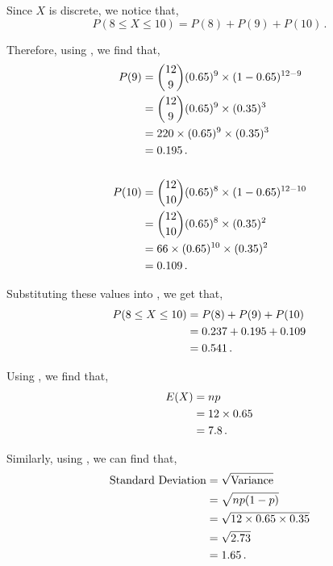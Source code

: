 \begin{subquestions}
\begin{subsubquestions}
\begin{subsubsubquestions}
Since $X$ is discrete, we notice that,
\begin{equation}
	P(8\leq X \leq 10) = P(8)+P(9)+P(10) \,. \label{2009:q4:Bin2}
\end{equation}

Therefore, using , we find that,
\begin{align}
	P(9) & = { 12 \choose 9} (0.65)^9 \times (1-0.65)^{12-9} \nonumber \\
	     & = { 12 \choose 9} (0.65)^9 \times (0.35)^{3} \nonumber \\
	     & = 220 \times (0.65)^9 \times (0.35)^{3} \nonumber \\
	     & = 0.195 \,. \\ \nonumber \\
	P(10) & = { 12 \choose 10} (0.65)^8 \times (1-0.65)^{12-10} \nonumber \\
         & = { 12 \choose 10} (0.65)^8 \times (0.35)^{2} \nonumber \\
	     & = 66 \times (0.65)^{10} \times (0.35)^{2} \nonumber \\
	     & = 0.109 \,.
\end{align}

Substituting these values into , we get that,
\begin{align}
	P(8\leq X \leq 10) & = P(8)+P(9)+P(10) \nonumber \\
	                   & = 0.237+0.195+0.109 \nonumber \\
	                   & = 0.541 \,.   
\end{align}

\end{subsubsubquestions}


\subsubquestion

Using , we find that,
\begin{align}
	E(X) & = np \nonumber \\
	     & = 12 \times 0.65 \nonumber \\
	     & = 7.8 \,.
\end{align}

Similarly, using , we can find that,
\begin{align}
	\text{Standard Deviation} & = \sqrt{\text{Variance}} \nonumber \\
	                          & = \sqrt{np(1-p)} \nonumber \\
	                          & = \sqrt{12\times0.65\times0.35} \nonumber \\
	                          & = \sqrt{2.73} \nonumber \\
	                          & = 1.65 \,.
\end{align}


\end{subsubquestions}
\end{subquestions}
